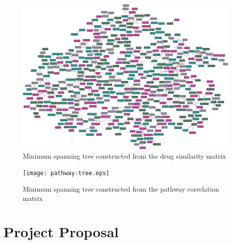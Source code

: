 \documentclass[12pt,a4paper,twoside,openright]{report}
\begin{document}
\begin{landscape}
	
	\begin{figure}[!htb]
		\centering
		\includegraphics[height=\textwidth]{drug-tree.eps}
		\caption{Minimum spanning tree constructed from the drug similarity matrix}
		\label{fig:drug-tree}
	\end{figure}
	
\end{landscape}

%	
%	
%
%	
%	

\begin{landscape}
	
	\begin{figure}[!htb]
		\centering
		\texttt{[image: pathway-tree.eps]}
		\caption{Minimum spanning tree constructed from the pathway correlation matrix}
		\label{fig:pathway-tree}
	\end{figure}
	
\end{landscape}

\chapter{Project Proposal}


\end{document}
